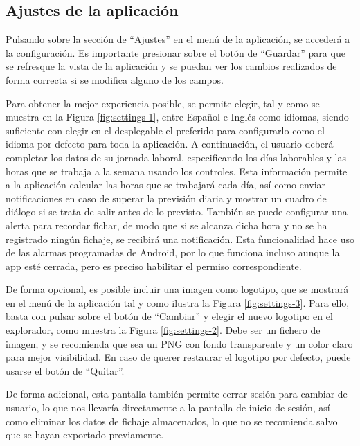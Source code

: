 \subsection{Ajustes de la aplicación}

Pulsando sobre la sección de “Ajustes” en el menú de la aplicación, se accederá a la configuración. Es importante presionar sobre el botón de “Guardar” para que se refresque la vista de la aplicación y se puedan ver los cambios realizados de forma correcta si se modifica alguno de los campos.

Para obtener la mejor experiencia posible, se permite elegir, tal y como se muestra en la Figura \ref{fig:settings-1}, entre Español e Inglés como idiomas, siendo suficiente con elegir en el desplegable el preferido para configurarlo como el idioma por defecto para toda la aplicación. A continuación, el usuario deberá completar los datos de su jornada laboral, especificando los días laborables y las horas que se trabaja a la semana usando los controles. Esta información permite a la aplicación calcular las horas que se trabajará cada día, así como enviar notificaciones en caso de superar la previsión diaria y mostrar un cuadro de diálogo si se trata de salir antes de lo previsto. También se puede configurar una alerta para recordar fichar, de modo que si se alcanza dicha hora y no se ha registrado ningún fichaje, se recibirá una notificación. Esta funcionalidad hace uso de las alarmas programadas de Android, por lo que funciona incluso aunque la app esté cerrada, pero es preciso habilitar el permiso correspondiente.

De forma opcional, es posible incluir una imagen como logotipo, que se mostrará en el menú de la aplicación tal y como ilustra la Figura \ref{fig:settings-3}. Para ello, basta con pulsar sobre el botón de “Cambiar” y elegir el nuevo logotipo en el explorador, como muestra la Figura \ref{fig:settings-2}. Debe ser un fichero de imagen, y se recomienda que sea un PNG con fondo transparente y un color claro para mejor visibilidad. En caso de querer restaurar el logotipo por defecto, puede usarse el botón de “Quitar”.

De forma adicional, esta pantalla también permite cerrar sesión para cambiar de usuario, lo que nos llevaría directamente a la pantalla de inicio de sesión, así como eliminar los datos de fichaje almacenados, lo que no se recomienda salvo que se hayan exportado previamente.

